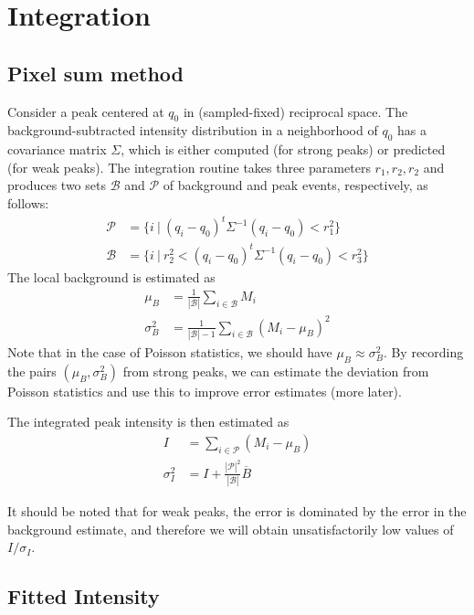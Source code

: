 \documentclass[11pt,a4paper]{article}
\def\calP{\mathcal{P}}
\def\calB{\mathcal{B}}
\begin{document}
\section{Integration} \label{integration}

\subsection{Pixel sum method}

Consider a peak centered at $q_0$ in (sampled-fixed) reciprocal space. The background-subtracted intensity distribution in a neighborhood of $q_0$ has a covariance matrix $\Sigma$, which is either computed (for strong peaks) or predicted (for weak peaks). The integration routine takes three parameters $r_1, r_2, r_2$ and produces
two sets $\calB$ and $\calP$ of background and peak events, respectively, as follows:
\begin{align}
  \calP &= \{ i \ | \ (q_i-q_0)^t \Sigma^{-1} (q_i-q_0) < r_1^2 \} \\
  \calB &= \{ i \ | \ r_2^2 < (q_i-q_0)^t \Sigma^{-1} (q_i-q_0) < r_3^2 \}
\end{align}
The local background is estimated as
\begin{align}
  \mu_B &= \frac{1}{|\calB|} \sum_{i \in \calB} M_i \\
  \sigma^2_B &= \frac{1}{|\calB|-1} \sum_{i \in \calB} (M_i - \mu_B)^2
\end{align}
Note that in the case of Poisson statistics, we should have $\mu_B \approx \sigma^2_B$. By recording the pairs $(\mu_B, \sigma^2_B)$ from strong peaks, we can estimate the deviation from Poisson statistics and use this to improve error estimates (more later).

The integrated peak intensity is then estimated as
\begin{align}
  I &= \sum_{i \in \calP} (M_i - \mu_B) \\
  \sigma^2_I &= I + \frac{|\calP|^2}{|\calB|} \overline{B}
\end{align}

It should be noted that for weak peaks, the error is dominated by the error in the background estimate, and therefore we will obtain unsatisfactorily low values of $I/\sigma_I$.


\subsection{Fitted Intensity}
\end{document}
